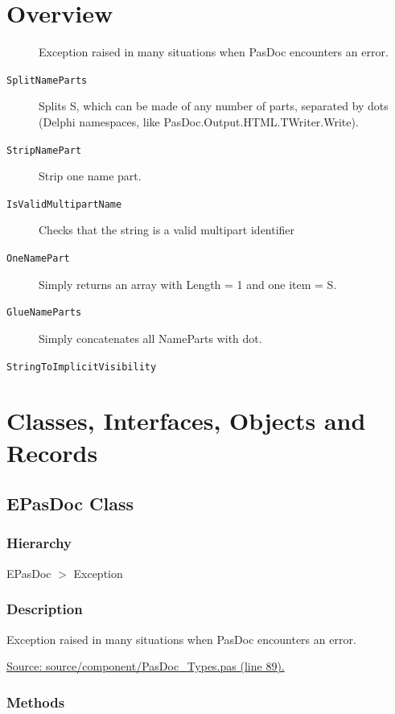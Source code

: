 \documentclass{report}
\newif\ifpdf
\begin{document}
\section{Overview}
\begin{description}
\item[\texttt{\begin{ttfamily}EPasDoc\end{ttfamily} Class}]Exception raised in many situations when PasDoc encounters an error.
\end{description}
\begin{description}
\item[\texttt{SplitNameParts}]Splits S, which can be made of any number of parts, separated by dots (Delphi namespaces, like PasDoc.Output.HTML.TWriter.Write).
\item[\texttt{StripNamePart}]Strip one name part.
\item[\texttt{IsValidMultipartName}]Checks that the string is a valid multipart identifier
\item[\texttt{OneNamePart}]Simply returns an array with Length = 1 and one item = S.
\item[\texttt{GlueNameParts}]Simply concatenates all NameParts with dot.
\item[\texttt{StringToImplicitVisibility}]
\end{description}
\section{Classes, Interfaces, Objects and Records}
\ifpdf
\subsection*{\large{\textbf{EPasDoc Class}}\normalsize\hspace{1ex}\hrulefill}
\else
\subsection*{EPasDoc Class}
\fi
\label{PasDoc_Types.EPasDoc}
\subsubsection*{\large{\textbf{Hierarchy}}\normalsize\hspace{1ex}\hfill}
EPasDoc {$>$} Exception
\subsubsection*{\large{\textbf{Description}}\normalsize\hspace{1ex}\hfill}
Exception raised in many situations when PasDoc encounters an error.\par
\href{https://github.com/pasdoc/pasdoc/blob/master/source/component/PasDoc_Types.pas#L89}{Source: source/component/PasDoc{\_}Types.pas (line 89).}\subsubsection*{\large{\textbf{Methods}}\normalsize\hspace{1ex}\hfill}
\end{document}
